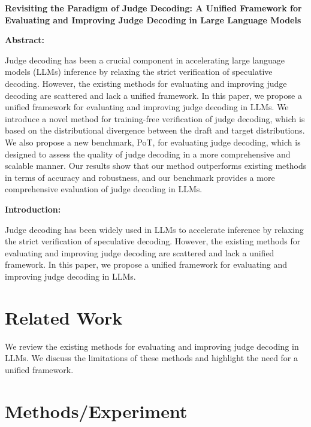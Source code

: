 \begin{titlepage}
\centering
\large
\textbf{Revisiting the Paradigm of Judge Decoding: A Unified Framework for Evaluating and Improving Judge Decoding in Large Language Models}

\vspace{2cm}
\large
\textbf{Abstract:}

\vspace{1cm}
\large
Judge decoding has been a crucial component in accelerating large language models (LLMs) inference by relaxing the strict verification of speculative decoding. However, the existing methods for evaluating and improving judge decoding are scattered and lack a unified framework. In this paper, we propose a unified framework for evaluating and improving judge decoding in LLMs. We introduce a novel method for training-free verification of judge decoding, which is based on the distributional divergence between the draft and target distributions. We also propose a new benchmark, PoT, for evaluating judge decoding, which is designed to assess the quality of judge decoding in a more comprehensive and scalable manner. Our results show that our method outperforms existing methods in terms of accuracy and robustness, and our benchmark provides a more comprehensive evaluation of judge decoding in LLMs.

\vspace{2cm}
\large
\textbf{Introduction:}

\vspace{1cm}
Judge decoding has been widely used in LLMs to accelerate inference by relaxing the strict verification of speculative decoding. However, the existing methods for evaluating and improving judge decoding are scattered and lack a unified framework. In this paper, we propose a unified framework for evaluating and improving judge decoding in LLMs.

\section*{Related Work}

\vspace{1cm}
We review the existing methods for evaluating and improving judge decoding in LLMs. We discuss the limitations of these methods and highlight the need for a unified framework.

\section*{Methods/Experiment}


\end{titlepage}
